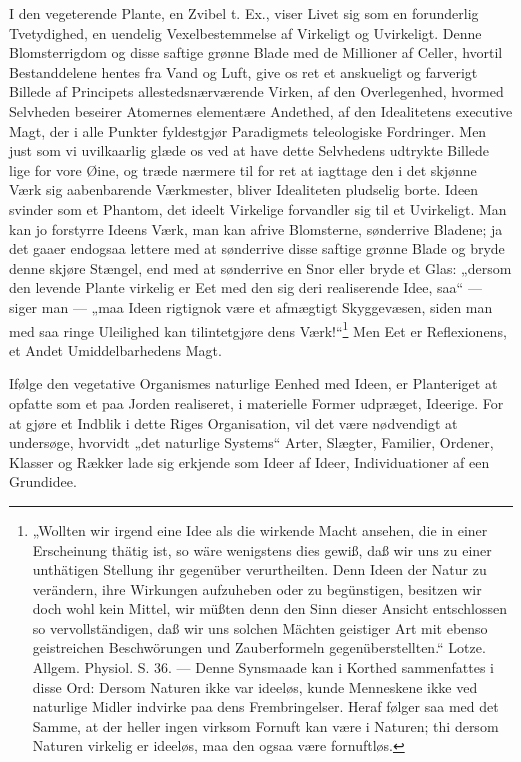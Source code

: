\documentclass[12pt,a4paper]{book}
\begin{document}
I den vegeterende Plante, en Zvibel t. Ex., viser Livet sig som en forunderlig
Tvetydighed, en uendelig Vexelbestemmelse af Virkeligt og Uvirkeligt. Denne
Blomsterrigdom og disse saftige grønne Blade med de Millioner af Celler, hvortil
Bestanddelene hentes fra Vand og Luft, give os ret et anskueligt og farverigt
Billede af Principets allestedsnærværende Virken, af den Overlegenhed, hvormed
Selvheden beseirer Atomernes elementære Andethed, af den Idealitetens executive
Magt, der i alle Punkter fyldestgjør Paradigmets teleologiske Fordringer. Men
just som vi uvilkaarlig glæde os ved at have dette Selvhedens udtrykte Billede
lige for vore Øine, og træde nærmere til for ret at iagttage den i det skjønne
Værk sig aabenbarende Værkmester, bliver Idealiteten pludselig borte. Ideen
svinder som et Phantom, det ideelt Virkelige forvandler sig til et Uvirkeligt.
Man kan jo forstyrre Ideens Værk, man kan afrive Blomsterne, sønderrive Bladene;
ja det gaaer endogsaa lettere med at sønderrive disse saftige grønne Blade og
bryde denne skjøre Stængel, end med at sønderrive en Snor eller bryde et Glas:
„dersom den levende Plante virkelig er Eet med den sig deri
\setcounter{footnote}{0}
realiserende Idee, saa“ --- siger man --- „maa Ideen rigtignok være et afmægtigt
Skyggevæsen, siden man med saa ringe Uleilighed kan tilintetgjøre dens
Værk!“\footnote{„Wollten wir irgend eine Idee als die wirkende Macht ansehen,
die in einer Erscheinung thätig ist, so wäre wenigstens dies gewiß, daß wir uns
zu einer unthätigen Stellung ihr gegenüber verurtheilten. Denn Ideen der Natur
zu verändern, ihre Wirkungen aufzuheben oder zu begünstigen, besitzen wir doch
wohl kein Mittel, wir müßten denn den Sinn dieser Ansicht entschlossen so
vervollständigen, daß wir uns solchen Mächten geistiger Art mit ebenso
geistreichen Beschwörungen und Zauberformeln gegenüberstellten.“ Lotze. Allgem.
Physiol. S. 36. --- Denne Synsmaade kan i Korthed sammenfattes i disse Ord:
Dersom Naturen ikke var ideeløs, kunde Menneskene ikke ved naturlige Midler
indvirke paa dens Frembringelser. Heraf følger saa med det Samme, at der heller
ingen virksom Fornuft kan være i Naturen; thi dersom Naturen virkelig er
ideeløs, maa den ogsaa være fornuftløs.} Men Eet er Reflexionens, et Andet
Umiddelbarhedens Magt.

Ifølge den vegetative Organismes naturlige Eenhed med Ideen, er Planteriget at
opfatte som et paa Jorden realiseret, i materielle Former udpræget, Ideerige.
For at gjøre et Indblik i dette Riges Organisation, vil det være nødvendigt at
undersøge, hvorvidt „det naturlige Systems“ Arter, Slægter, Familier, Ordener,
Klasser og Rækker lade sig erkjende som Ideer af Ideer, Individuationer af een
Grundidee.
\end{document}
